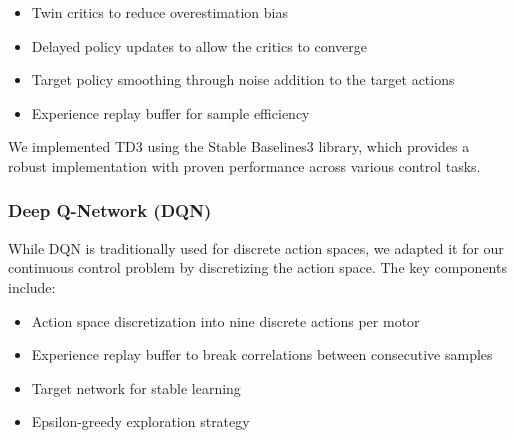 \documentclass[12pt]{article}
\begin{document}
\begin{itemize}
    \item Twin critics to reduce overestimation bias
    \item Delayed policy updates to allow the critics to converge
    \item Target policy smoothing through noise addition to the target actions
    \item Experience replay buffer for sample efficiency
\end{itemize}


We implemented TD3 using the Stable Baselines3 library, which provides a robust implementation with proven performance across various control tasks.


\subsubsection{Deep Q-Network (DQN)}

While DQN is traditionally used for discrete action spaces, we adapted it for our continuous control problem by discretizing the action space. The key components include:


\begin{itemize}
    \item Action space discretization into nine discrete actions per motor
    \item Experience replay buffer to break correlations between consecutive samples
    \item Target network for stable learning
    \item Epsilon-greedy exploration strategy
\end{itemize}

\end{document}
